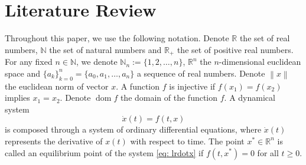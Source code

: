 \documentclass[11pt]{article}
\theoremstyle{definition}
\DeclareMathOperator{\dom}{dom}
\begin{document}
\section{Literature Review}
\label{sec: literaturereview}

Throughout this paper, we use the following notation. Denote $\mathbb{R}$ the set of real numbers, $\mathbb{N}$ the set of natural numbers and $\mathbb{R}_{+}$ the set of positive real numbers. For any fixed $n \in \mathbb{N}$, we denote $\mathbb{N}_n := \{ 1, 2, \dots, n \}$, $\mathbb{R}^n$ the $n$-dimensional euclidean space and $\{ a_k \}_{k=0}^{n} = \{ a_0, a_1, \dots, a_n \}$ a sequence of real numbers. Denote $ \left\lVert x \right\rVert$ the euclidean norm of vector $x$. A function $f$ is injective if $f(x_1) = f(x_2)$ implies $x_1 = x_2$. Denote $\dom{f}$ the domain of the function $f$. 
A dynamical system
\begin{equation} \label{eq: lrdotx}
\dot{x}(t) = f(t, x)
\end{equation} 
is composed through a system of ordinary differential equations, where $\dot{x}(t)$ represents the derivative of $x(t)$ with respect to time. 
The point $x^* \in \mathbb{R}^n$ is called an equilibrium point of the system \eqref{eq: lrdotx} if $f(t, x^*) = 0 $ for all $t \geq 0$.
\end{document}
